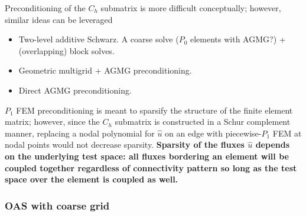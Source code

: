 \documentclass{article}
\newcommand{\uh}{\widehat{u}}
\begin{document}
Preconditioning of the $C_h$ submatrix is more difficult conceptually; however, similar ideas can be leveraged
\begin{itemize}
\item Two-level additive Schwarz.  A coarse solve ($P_0$ elements with AGMG?) + (overlapping) block solves. 
\item Geometric multigrid + AGMG preconditioning.  
\item Direct AGMG preconditioning.  
\end{itemize}
$P_1$ FEM preconditioning is meant to sparsify the structure of the finite element matrix; however, since the $C_h$ submatrix is constructed in a Schur complement manner, replacing a nodal polynomial for $\uh$ on an edge with piecewise-$P_1$ FEM at nodal points would not decrease sparsity.  \textbf{Sparsity of the fluxes $\uh$ depends on the underlying test space: all fluxes bordering an element will be coupled together regardless of connectivity pattern so long as the test space over the element is coupled as well.}  

\subsubsection{OAS with coarse grid}
\end{document}

